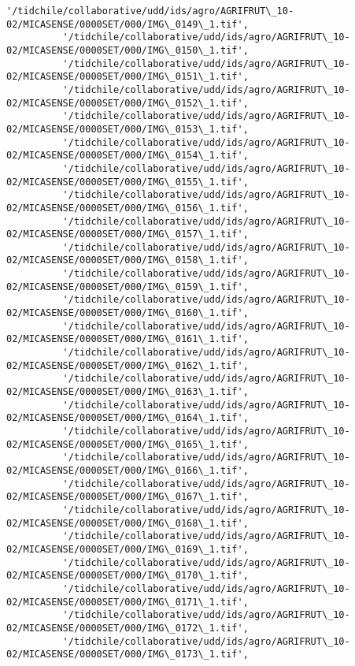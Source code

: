 \documentclass[11pt]{article}
\begin{document}
\begin{Verbatim}[commandchars=\\\{\}]
          '/tidchile/collaborative/udd/ids/agro/AGRIFRUT\_10-02/MICASENSE/0000SET/000/IMG\_0149\_1.tif',
          '/tidchile/collaborative/udd/ids/agro/AGRIFRUT\_10-02/MICASENSE/0000SET/000/IMG\_0150\_1.tif',
          '/tidchile/collaborative/udd/ids/agro/AGRIFRUT\_10-02/MICASENSE/0000SET/000/IMG\_0151\_1.tif',
          '/tidchile/collaborative/udd/ids/agro/AGRIFRUT\_10-02/MICASENSE/0000SET/000/IMG\_0152\_1.tif',
          '/tidchile/collaborative/udd/ids/agro/AGRIFRUT\_10-02/MICASENSE/0000SET/000/IMG\_0153\_1.tif',
          '/tidchile/collaborative/udd/ids/agro/AGRIFRUT\_10-02/MICASENSE/0000SET/000/IMG\_0154\_1.tif',
          '/tidchile/collaborative/udd/ids/agro/AGRIFRUT\_10-02/MICASENSE/0000SET/000/IMG\_0155\_1.tif',
          '/tidchile/collaborative/udd/ids/agro/AGRIFRUT\_10-02/MICASENSE/0000SET/000/IMG\_0156\_1.tif',
          '/tidchile/collaborative/udd/ids/agro/AGRIFRUT\_10-02/MICASENSE/0000SET/000/IMG\_0157\_1.tif',
          '/tidchile/collaborative/udd/ids/agro/AGRIFRUT\_10-02/MICASENSE/0000SET/000/IMG\_0158\_1.tif',
          '/tidchile/collaborative/udd/ids/agro/AGRIFRUT\_10-02/MICASENSE/0000SET/000/IMG\_0159\_1.tif',
          '/tidchile/collaborative/udd/ids/agro/AGRIFRUT\_10-02/MICASENSE/0000SET/000/IMG\_0160\_1.tif',
          '/tidchile/collaborative/udd/ids/agro/AGRIFRUT\_10-02/MICASENSE/0000SET/000/IMG\_0161\_1.tif',
          '/tidchile/collaborative/udd/ids/agro/AGRIFRUT\_10-02/MICASENSE/0000SET/000/IMG\_0162\_1.tif',
          '/tidchile/collaborative/udd/ids/agro/AGRIFRUT\_10-02/MICASENSE/0000SET/000/IMG\_0163\_1.tif',
          '/tidchile/collaborative/udd/ids/agro/AGRIFRUT\_10-02/MICASENSE/0000SET/000/IMG\_0164\_1.tif',
          '/tidchile/collaborative/udd/ids/agro/AGRIFRUT\_10-02/MICASENSE/0000SET/000/IMG\_0165\_1.tif',
          '/tidchile/collaborative/udd/ids/agro/AGRIFRUT\_10-02/MICASENSE/0000SET/000/IMG\_0166\_1.tif',
          '/tidchile/collaborative/udd/ids/agro/AGRIFRUT\_10-02/MICASENSE/0000SET/000/IMG\_0167\_1.tif',
          '/tidchile/collaborative/udd/ids/agro/AGRIFRUT\_10-02/MICASENSE/0000SET/000/IMG\_0168\_1.tif',
          '/tidchile/collaborative/udd/ids/agro/AGRIFRUT\_10-02/MICASENSE/0000SET/000/IMG\_0169\_1.tif',
          '/tidchile/collaborative/udd/ids/agro/AGRIFRUT\_10-02/MICASENSE/0000SET/000/IMG\_0170\_1.tif',
          '/tidchile/collaborative/udd/ids/agro/AGRIFRUT\_10-02/MICASENSE/0000SET/000/IMG\_0171\_1.tif',
          '/tidchile/collaborative/udd/ids/agro/AGRIFRUT\_10-02/MICASENSE/0000SET/000/IMG\_0172\_1.tif',
          '/tidchile/collaborative/udd/ids/agro/AGRIFRUT\_10-02/MICASENSE/0000SET/000/IMG\_0173\_1.tif',

\end{Verbatim}
\end{document}
